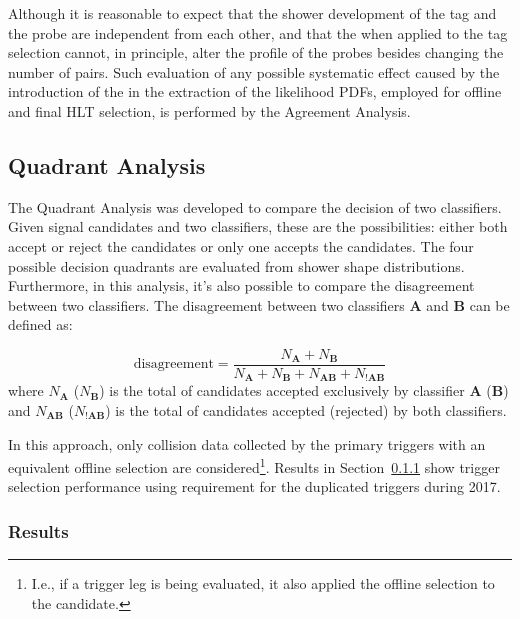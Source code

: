 Although it is reasonable to expect that the shower development of the tag and
the probe are independent from each other, and that the \rnn{} when applied to
the tag selection cannot, in principle, alter the profile of the probes besides
changing the number of \tnp{} pairs. Such evaluation of any possible systematic effect caused by the introduction of the \rnn{} in the extraction of the likelihood PDFs, employed for offline and final HLT selection, is performed by the Agreement Analysis.



\subsection{Quadrant Analysis}\label{ssec:quadrant}

The Quadrant Analysis was developed to compare the decision of two classifiers. Given signal candidates and two classifiers, these are the possibilities: either both accept or reject the candidates or only one accepts the candidates. The four possible decision quadrants are evaluated from shower shape distributions. Furthermore, in this analysis, it's also possible to compare the disagreement between two classifiers. The disagreement between two classifiers $\textbf{A}$ and $\textbf{B}$ can be defined as:

\begin{equation}
    \text{disagreement} = \frac{N_{\textbf{A}}+N_{\textbf{B}}}{N_{\textbf{A}}+N_{\textbf{B}}+N_{\textbf{AB}}+N_{!\textbf{AB}}}
    \label{eq:disagreement}
\end{equation}
where $N_{\textbf{A}}$ ($N_{\textbf{B}}$) is the total of candidates accepted exclusively by classifier $\textbf{A}$ ($\textbf{B}$) and $N_{\textbf{AB}}$ ($N_{\textbf{!AB}}$) is the total of candidates accepted (rejected) by both classifiers.

In this approach, only collision data collected by the primary triggers with an equivalent offline selection are considered\footnote{I.e., if a \tight{} trigger leg is being evaluated, it also applied the \tight{} offline selection to the candidate.}.
Results in Section~\ref{top:quadrant_results} show
trigger selection performance using \tight{} requirement for the duplicated triggers during 2017.

\subsubsection{Results}\label{top:quadrant_results}



